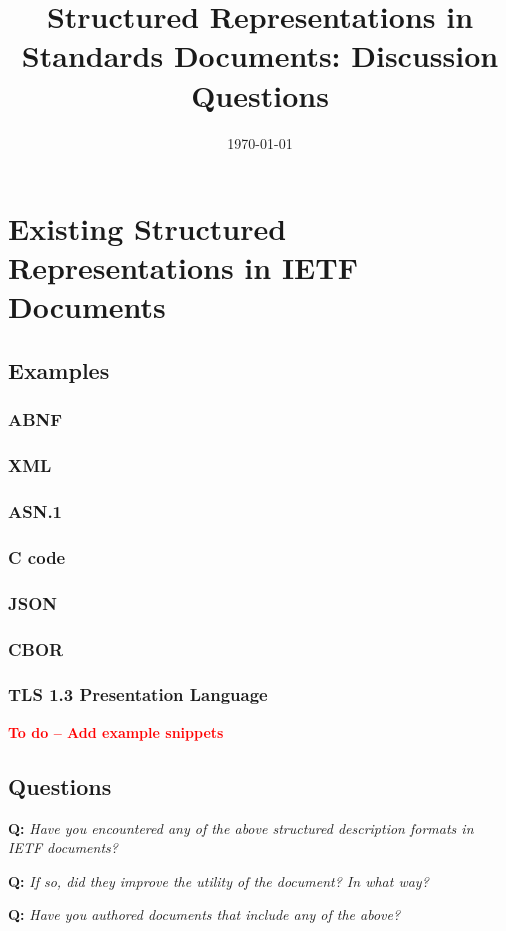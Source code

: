 \documentclass[10pt]{article}
\title{Structured Representations in Standards Documents: Discussion Questions}
\date{\today}
\newcommand{\todo}[1]{\textbf{\textcolor{red}{To do -- #1}}}
\newcommand{\question}[1]{\vspace{4mm}\noindent\textbf{Q:} \textit{#1}}
\begin{document}
\maketitle

\section{Existing Structured Representations in IETF Documents}

\subsection{Examples}

\subsubsection*{ABNF}
\subsubsection*{XML}
\subsubsection*{ASN.1}
\subsubsection*{C code}
\subsubsection*{JSON}
\subsubsection*{CBOR}
\subsubsection*{TLS 1.3 Presentation Language}

\todo{Add example snippets}

\subsection{Questions}

\question{Have you encountered any of the above structured description formats in IETF documents?}

\question{If so, did they improve the utility of the document? In what way?}

\question{Have you authored documents that include any of the above?}
\end{document}
